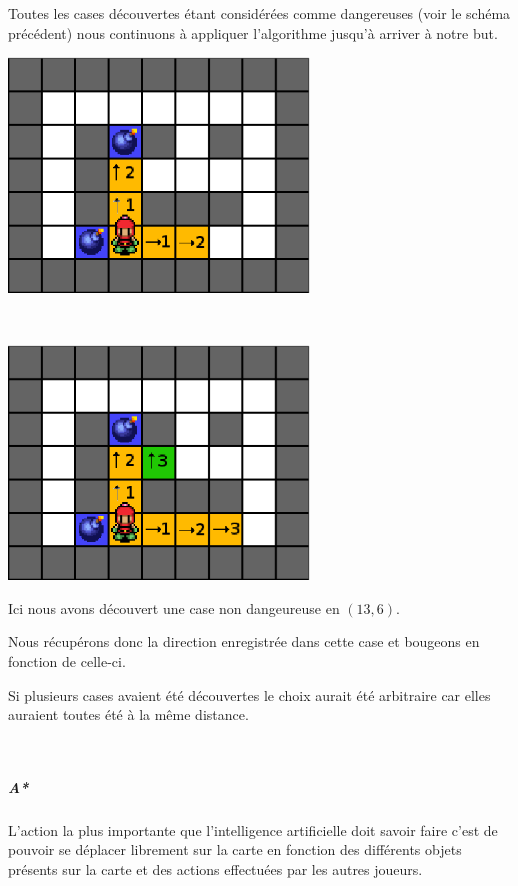 			
			Toutes les cases découvertes étant considérées comme dangereuses (voir le schéma précédent) nous continuons à appliquer l'\gls{algorithme} jusqu'à arriver à notre but.
			
			\begin{center}
				\includegraphics[width=8cm]{./Analyse/Img/largeur_3.eps}
				
				$\,$
				
				\includegraphics[width=8cm]{./Analyse/Img/largeur_4.eps}
			\end{center}
			
			Ici nous avons découvert une case non dangeureuse en $(13,6)$.
			
			Nous récupérons donc la direction enregistrée dans cette case et bougeons en fonction de celle-ci.
			
			Si plusieurs cases avaient été découvertes le choix aurait été arbitraire car elles auraient toutes été à la même distance.
			
			$\,$
			
		\subparagraph{A*\\}
		
			L'action la plus importante que l'intelligence artificielle doit savoir faire c'est de pouvoir se déplacer librement sur la carte en fonction des différents objets présents sur la carte et des actions effectuées par les autres joueurs.
		
